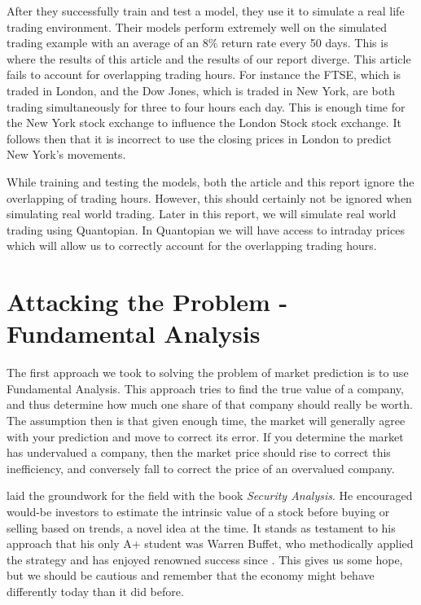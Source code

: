 \documentclass{report}
\begin{document}
After they successfully train and test a model, they use it to simulate a real life trading environment. Their models perform extremely well on the simulated trading example with an average of an 8\% return rate every 50 days. This is where the results of this article and the results of our report diverge. This article fails to account for overlapping trading hours. For instance the FTSE, which is traded in London, and the Dow Jones, which is traded in New York, are both trading simultaneously for three to four hours each day. This is enough time for the New York stock exchange to influence the London Stock stock exchange. It follows then that it is incorrect to use the closing prices in London to predict New York's movements.

While training and testing the models, both the article and this report ignore the overlapping of trading hours. However, this should certainly not be ignored when simulating real world trading. Later in this report, we will simulate real world trading using Quantopian. In Quantopian we will have access to intraday prices which will allow us to correctly account for the overlapping trading hours. 

\chapter{Attacking the Problem - Fundamental Analysis}

The first approach we took to solving the problem of market prediction is to use Fundamental Analysis. This approach tries to find the true value of a company, and thus determine how much one share of that company should really be worth. The assumption then is that given enough time, the market will generally agree with your prediction and move to correct its error. If you determine the market has undervalued a company, then the market price should rise to correct this inefficiency, and conversely fall to correct the price of an overvalued company. 

\citet{graham1934security} laid the groundwork for the field with the book \textit{Security Analysis}. He encouraged would-be investors to estimate the intrinsic value of a stock before buying or selling based on trends, a novel idea at the time. It stands as testament to his approach that his only A+ student was Warren Buffet, who methodically applied the strategy and has enjoyed renowned success since \cite{schroeder2008snowball}. This gives us some hope, but we should be cautious and remember that the economy might behave differently today than it did before.
\end{document}
